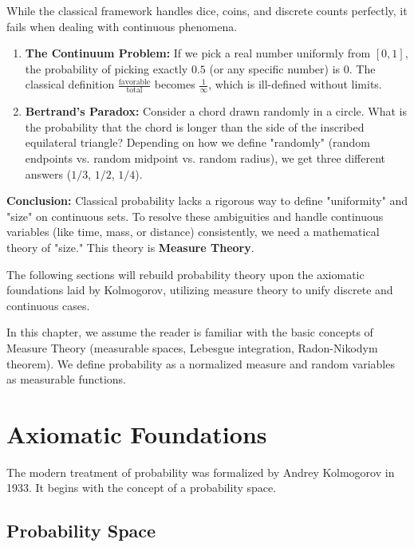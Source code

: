 \documentclass[oneside]{book}
\begin{document}
While the classical framework handles dice, coins, and discrete counts perfectly, it fails when dealing with continuous phenomena.

\begin{enumerate}
    \item \textbf{The Continuum Problem:} If we pick a real number uniformly from $[0, 1]$, the probability of picking exactly $0.5$ (or any specific number) is 0. The classical definition $\frac{\text{favorable}}{\text{total}}$ becomes $\frac{1}{\infty}$, which is ill-defined without limits.
    
    \item \textbf{Bertrand's Paradox:} Consider a chord drawn randomly in a circle. What is the probability that the chord is longer than the side of the inscribed equilateral triangle?
    Depending on how we define "randomly" (random endpoints vs. random midpoint vs. random radius), we get three different answers ($1/3$, $1/2$, $1/4$).
\end{enumerate}

\textbf{Conclusion:} Classical probability lacks a rigorous way to define "uniformity" and "size" on continuous sets. To resolve these ambiguities and handle continuous variables (like time, mass, or distance) consistently, we need a mathematical theory of "size." This theory is \textbf{Measure Theory}.

The following sections will rebuild probability theory upon the axiomatic foundations laid by Kolmogorov, utilizing measure theory to unify discrete and continuous cases.

\begin{remark}
In this chapter, we assume the reader is familiar with the basic concepts of Measure Theory (measurable spaces, Lebesgue integration, Radon-Nikodym theorem). We define probability as a normalized measure and random variables as measurable functions.
\end{remark}

\section{Axiomatic Foundations}

The modern treatment of probability was formalized by Andrey Kolmogorov in 1933. It begins with the concept of a probability space.

\subsection{Probability Space}
\end{document}
